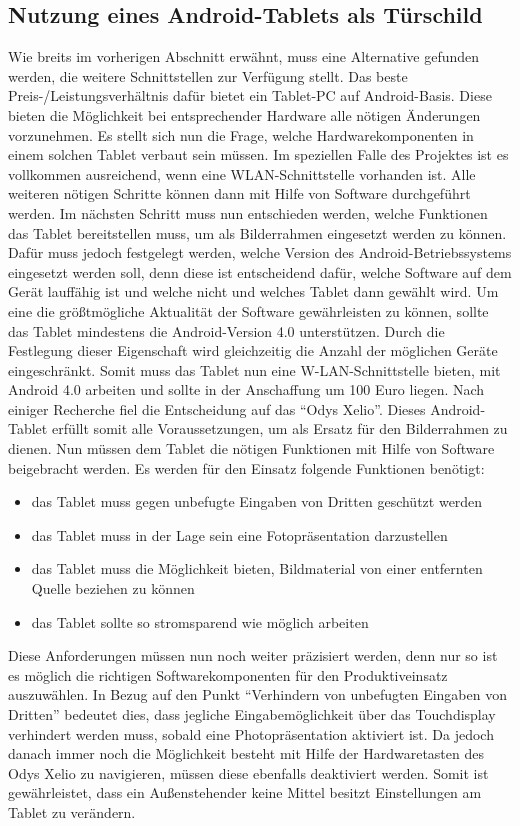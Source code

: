 \begin{flushleft}
\subsection{Nutzung eines Android-Tablets als Türschild}
Wie breits im vorherigen Abschnitt erwähnt, muss eine Alternative gefunden werden, die weitere Schnittstellen zur Verfügung stellt. Das beste Preis-/Leistungsverhältnis dafür bietet ein Tablet-PC auf Android-Basis. Diese bieten die Möglichkeit bei entsprechender Hardware alle nötigen Änderungen vorzunehmen. Es stellt sich nun die Frage, welche Hardwarekomponenten in einem solchen Tablet verbaut sein müssen. Im speziellen Falle des Projektes ist es vollkommen ausreichend, wenn eine WLAN-Schnittstelle vorhanden ist. Alle weiteren nötigen Schritte können dann mit Hilfe von Software durchgeführt werden. 
Im nächsten Schritt muss nun entschieden werden, welche Funktionen das Tablet bereitstellen muss, um als Bilderrahmen eingesetzt werden zu können. Dafür muss jedoch festgelegt werden, welche Version des Android-Betriebssystems eingesetzt werden soll, denn diese ist entscheidend dafür, welche Software auf dem Gerät lauffähig ist und welche nicht und welches Tablet dann gewählt wird. Um eine die größtmögliche Aktualität der Software gewährleisten zu können, sollte das Tablet mindestens die Android-Version 4.0 unterstützen. Durch die Festlegung dieser Eigenschaft wird gleichzeitig die Anzahl der möglichen Geräte eingeschränkt. Somit muss das Tablet nun eine W-LAN-Schnittstelle bieten, mit Android 4.0 arbeiten und sollte in der Anschaffung um 100 Euro liegen. Nach einiger Recherche fiel die Entscheidung auf das ``Odys Xelio''. Dieses Android-Tablet erfüllt somit alle Voraussetzungen, um als Ersatz für den Bilderrahmen zu dienen. 
Nun müssen dem Tablet die nötigen Funktionen mit Hilfe von Software beigebracht werden. Es werden für den Einsatz folgende Funktionen benötigt:
\begin{itemize}
  \item das Tablet muss gegen unbefugte Eingaben von Dritten geschützt werden
  \item das Tablet muss in der Lage sein eine Fotopräsentation darzustellen
  \item das Tablet muss die Möglichkeit bieten, Bildmaterial von einer entfernten Quelle beziehen zu können
  \item das Tablet sollte so stromsparend wie möglich arbeiten
\end{itemize}

Diese Anforderungen müssen nun noch weiter präzisiert werden, denn nur so ist es möglich die richtigen Softwarekomponenten für den Produktiveinsatz auszuwählen. 
In Bezug auf den Punkt ``Verhindern von unbefugten Eingaben von Dritten'' bedeutet dies, dass jegliche Eingabemöglichkeit über das Touchdisplay verhindert werden muss, sobald eine Photopräsentation aktiviert ist. Da jedoch danach immer noch die Möglichkeit besteht mit Hilfe der Hardwaretasten des Odys Xelio zu navigieren, müssen diese ebenfalls deaktiviert werden. Somit ist gewährleistet, dass ein Außenstehender keine Mittel besitzt Einstellungen am Tablet zu verändern. 


\end{flushleft}
